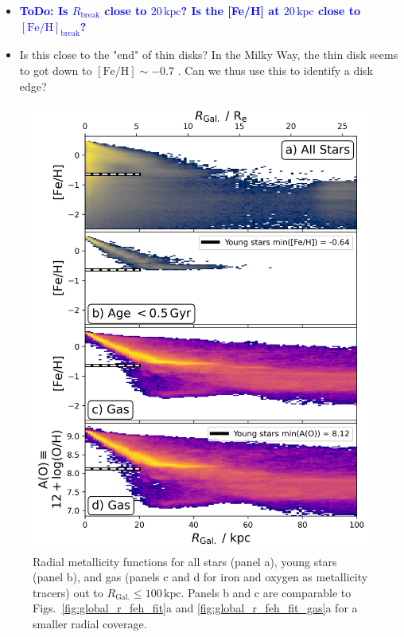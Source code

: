 \documentclass[fleqn,usenatbib]{mnras}
\newcommand{\ToDo}[1]{\textbf{\textcolor{blue}{ToDo: #1}}}
\begin{document}
\begin{itemize}
    \item \ToDo{Is $R_\mathrm{break}$ close to $20\,\mathrm{kpc}$? Is the [Fe/H] at $20\,\mathrm{kpc}$ close to $\mathrm{[Fe/H]}_\mathrm{break}$?}
    \item Is this close to the "end" of thin disks? In the Milky Way, the thin disk seems to got down to $\mathrm{[Fe/H]} \sim -0.7$ \citep{Bensby2014, Buder2019}. Can we thus use this to identify a disk edge?
\end{itemize}

\begin{figure}
    \centering
    \includegraphics[width=\columnwidth]{figures/trace_stars_and_gas_100kpc.png}
    \caption{Radial metallicity functions for all stars (panel a), young stars (panel b), and gas (panels c and d for iron and oxygen as metallicity tracers) out to $R_\mathrm{Gal.} \leq 100\,\mathrm{kpc}$. Panels b and c are comparable to Figs.~\ref{fig:global_r_feh_fit}a and \ref{fig:global_r_feh_fit_gas}a for a smaller radial coverage.}
    \label{fig:trace_stars_and_gas_100kpc}
\end{figure}
\end{document}
